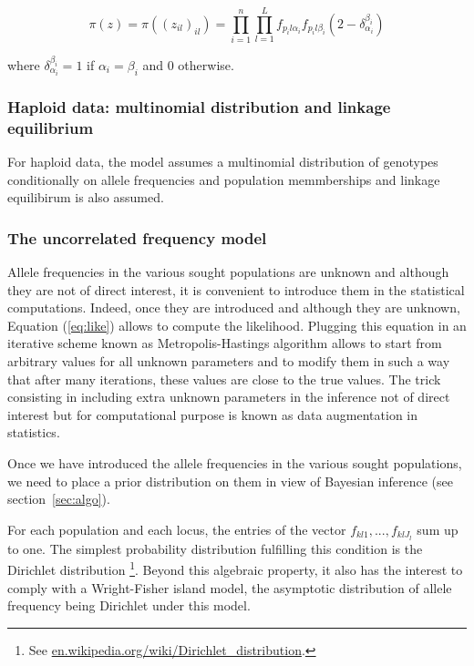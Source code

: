 \documentclass[a4paper,10pt]{article}
\begin{document}
\begin{equation}\label{eq:like}
\pi(z) = \pi((z_{il})_{il}) = \prod_{i=1}^n  \prod_{l=1}^L f_{p_il\alpha_i}f_{p_il\beta_i}(2-\delta_{\alpha_i}^{\beta_i})
\end{equation}

where $\delta_{\alpha_i}^{\beta_i}=1$ if $\alpha_i = \beta_i$  and  $0$ otherwise.


\subsubsection{Haploid data: multinomial distribution and linkage equilibrium}
For haploid data, the model assumes a multinomial distribution of genotypes conditionally 
on allele frequencies and population memmberships and linkage equilibirum is also assumed.

\subsubsection{The uncorrelated frequency model}

Allele frequencies in the various sought populations are unknown and although they are not of direct interest, 
it is convenient to introduce them in the statistical computations. Indeed, once they are introduced and although 
they are unknown, Equation (\ref{eq:like}) allows to compute the  likelihood. Plugging this equation in an iterative scheme known 
as  Metropolis-Hastings algorithm allows to start from arbitrary values for  
all unknown parameters and to modify them in such 
a way that after many iterations, these values are close to the true values. 
The trick consisting in including extra unknown parameters in the inference not of direct interest but for 
computational purpose is known as data augmentation in statistics. 


Once we have introduced the allele frequencies in the various sought populations, we need to place a prior distribution on them 
in view of Bayesian inference (see section~\ref{sec:algo}).

For each population and each locus, the entries of the vector $f_{kl1},...,f_{klJ_l}$ sum up to one. 
The simplest probability distribution fulfilling this condition is the Dirichlet distribution 
\footnote{See \url{ en.wikipedia.org/wiki/Dirichlet\_distribution}.}.
Beyond this algebraic property, 
it also has the interest to comply with a Wright-Fisher island model, the asymptotic distribution of allele frequency being 
Dirichlet under this model. 
\end{document}
